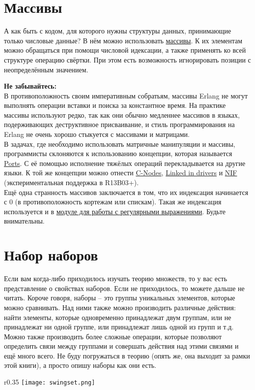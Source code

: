 \section{Массивы}
\label{arrays}
А как быть с кодом, для которого нужны структуры данных, принимающие только числовые данные?
В нём можно использовать \href{http://erldocs.com/R15B/stdlib/array.html}{массивы}.
К их элементам можно обращаться при помощи числовой идексации, а также применять ко всей структуре операцию свёртки.
При этом есть возможность игнорировать позиции с неопределённым значением.
\colorbox{lorange}
{
    \begin{minipage}{1.0\linewidth}
        \textbf{Не забывайтесь:}\\
В противоположность своим императивным собратьям, массивы Erlang не могут выполнять операции вставки и поиска за константное время.
На практике массивы используют редко, так как они обычно медленнее массивов в языках, подерживающих деструктивное присваивание, и стиль программирования на Erlang не очень хорошо стыкуется с массивами и матрицами.\\
В задачах, где необходимо использовать матричные манипуляции и массивы, программисты склоняются к использованию концепции, которая называется \href{http://www.erlang.org/doc/tutorial/c\_port.html}{Ports}.
С её помощью исполнение тяжёлых операций перекладывается на другие языки.
К той же концепции можно отнести \href{http://www.erlang.org/doc/tutorial/cnode.html}{C-Nodes}, \href{http://www.erlang.org/doc/tutorial/c\_portdriver.html}{Linked in drivers} и \href{http://erldocs.com/R15B/erts/erl\_nif.html}{NIF} (экспериментальная поддержка в R13B03+).\\
Ещё одна странность массивов заключается в том, что их индексация начинается с 0 (в противоположность кортежам или спискам).
Такая же индексация используется и в \href{http://erldocs.com/R15B/stdlib/re.html}{модуле для работы с регулярными выражениями}.
Будьте внимательны.
    \end{minipage}
}
\section{Набор наборов}
\label{a-set-of-sets}
Если вам когда\--либо приходилось изучать теорию множеств, то у вас есть представление о свойствах наборов.
Если не приходилось, то можете дальше не читать.
Короче говоря, наборы \--- это группы уникальных элементов, которые можно сравнивать.
Над ними также можно производить различные действия: найти элементы, которые одновременно принадлежат двум группам, или не принадлежат ни одной группе, или принадлежат лишь одной из групп и т.д.
Можно также производить более сложные операции, которые позволяют определить связи между группами и совершать действия над этими связями и ещё много всего.
Не буду погружаться в теорию (опять же, она выходит за рамки этой книги), а просто опишу наборы как они есть.
\begin{wrapfigure}{r}{0.35\linewidth}
    \texttt{[image: swingset.png]}
\end{wrapfigure}

